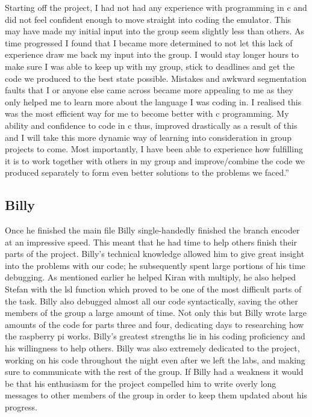 \documentclass[a4wide, 10pt]{article}
\begin{document}
Starting off the project, I had not had any experience with programming in c and did not feel confident enough to move straight into coding the emulator. This may have made my initial input into the group seem slightly less than others. As time progressed I found that I became more determined to not let this lack of experience draw me back my input into the group. I would stay longer hours to make sure I was able to keep up with my group, stick to deadlines and get the code we produced to the best state possible. Mistakes and awkward segmentation faults that I or anyone else came across became more appealing to me as they only helped me to learn more about the language I was coding in. I realised this was the most efficient way for me to become better with c programming. My ability and confidence to code in c thus, improved drastically as a result of this and I will take this more dynamic way of learning into consideration in group projects to come. Most importantly, I have been able to experience how fulfilling it is to work together with others in my group and improve/combine the code we produced separately to form even better solutions to the problems we faced.\textquotedblright

\subsection*{Billy}

Once he finished the main file Billy single-handedly finished the branch encoder at an impressive speed. This meant that he had time to help others finish their parts of the project. Billy's technical knowledge allowed him to give great insight into the problems with our code; he subsequently spent large portions of his time debugging. As mentioned earlier he helped Kiran with multiply, he also helped Stefan with the lsl function which proved to be one of the most difficult parts of the task. Billy also debugged almost all our code syntactically, saving the other members of the group a large amount of time. Not only this but Billy wrote large amounts of the code for parts three and four, dedicating days to researching how the raspberry pi works.  Billy's greatest strengths lie in his coding proficiency and his willingness to help others. Billy was also extremely dedicated to the project, working on his code throughout the night even after we left the labs, and making sure to communicate with the rest of the group. If Billy had a weakness it would be that his enthusiasm for the project compelled him to write overly long messages to other members of the group in order to keep them updated about his progress.
\end{document}
